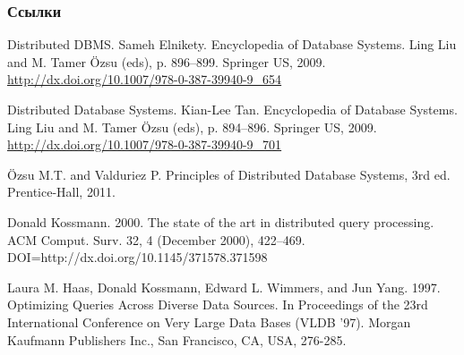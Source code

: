 \documentclass{beamer}
\begin{document}
\begin{frame}[allowframebreaks]
\frametitle{Ссылки}
\footnotesize{
\begin{thebibliography}{99}


 Distributed DBMS. Sameh Elnikety. Encyclopedia of Database Systems. Ling Liu and M. Tamer {\"O}zsu (eds), p. 896--899. Springer US, 2009. \url{http://dx.doi.org/10.1007/978-0-387-39940-9\_654}

 Distributed Database Systems. Kian-Lee Tan. Encyclopedia of Database Systems. Ling Liu and M. Tamer {\"O}zsu (eds), p. 894--896. Springer US, 2009. \url{http://dx.doi.org/10.1007/978-0-387-39940-9_701}

 {\"O}zsu M.T. and Valduriez P. Principles of Distributed Database Systems, 3rd ed. Prentice-Hall, 2011.

 Donald Kossmann. 2000. The state of the art in distributed query processing. ACM Comput. Surv. 32, 4 (December 2000), 422--469. DOI=http://dx.doi.org/10.1145/371578.371598 

 Laura M. Haas, Donald Kossmann, Edward L. Wimmers, and Jun Yang. 1997. Optimizing Queries Across Diverse Data Sources. In Proceedings of the 23rd International Conference on Very Large Data Bases (VLDB '97). Morgan Kaufmann Publishers Inc., San Francisco, CA, USA, 276-285. 







\end{thebibliography}}
\end{frame}
\end{document}
